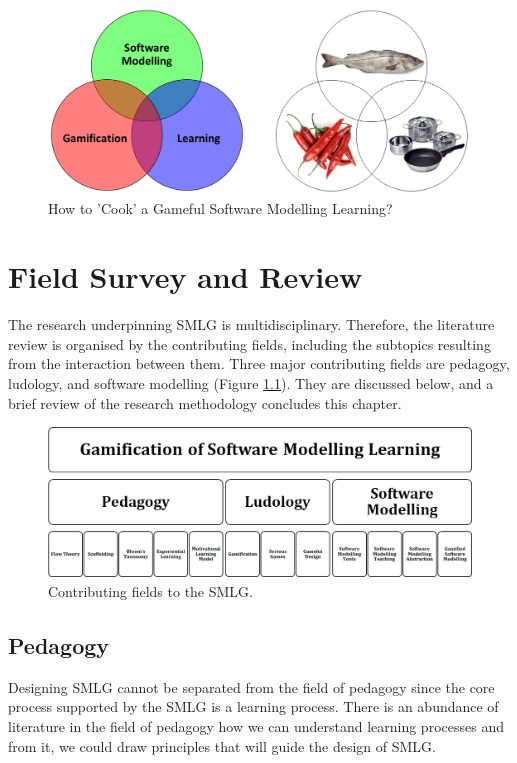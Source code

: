 \documentclass[12pt, a4paper]{report}
\begin{document}
\begin{figure}[ht]
\centering
\includegraphics[width=\textwidth]{smlg}
\caption{How to 'Cook' a Gameful Software Modelling Learning?}
\label{smlg}
\end{figure}




\chapter{Field Survey and Review}
\label{Field Survey and Review}
The research underpinning SMLG is multidisciplinary. Therefore, the literature review is organised by the contributing fields, including the subtopics resulting from the interaction between them. Three major contributing fields are pedagogy, ludology, and software modelling (Figure \ref{smlg2}). They are discussed below, and a brief review of the research methodology concludes this chapter.

\begin{figure}[ht]
\centering
\includegraphics[width=\textwidth]{smlg2}
\caption{Contributing fields to the SMLG.}
\label{smlg2}
\end{figure}

\section{Pedagogy}
\label{Pedagogy}
Designing SMLG cannot be separated from the field of pedagogy since the core process supported by the SMLG is a learning process. There is an abundance of literature in the field of pedagogy how we can understand learning processes and from it, we could draw principles that will guide the design of SMLG. 
\end{document}
